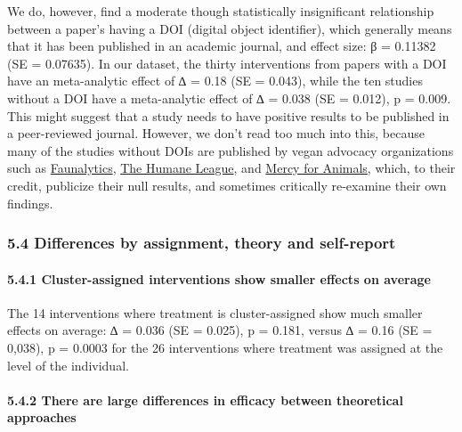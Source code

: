 \documentclass[
  letterpaper,
  DIV=11,
  numbers=noendperiod]{scrartcl}
\let\oldparagraph\paragraph
\renewcommand{\paragraph}[1]{\oldparagraph{#1}\mbox{}}
\begin{document}
We do, however, find a moderate though statistically insignificant
relationship between a paper's having a DOI (digital object identifier),
which generally means that it has been published in an academic journal,
and effect size: β = 0.11382 (SE = 0.07635). In our dataset, the thirty
interventions from papers with a DOI have an meta-analytic effect of ∆ =
0.18 (SE = 0.043), while the ten studies without a DOI have a
meta-analytic effect of ∆ = 0.038 (SE = 0.012), p = 0.009. This might
suggest that a study needs to have positive results to be published in a
peer-reviewed journal. However, we don't read too much into this,
because many of the studies without DOIs are published by vegan advocacy
organizations such as
\href{https://forum.effectivealtruism.org/topics/faunalytics}{Faunalytics},
\href{https://forum.effectivealtruism.org/topics/the-humane-league}{The
Humane League}, and
\href{https://www.google.com/search?q=mercy+for+animals+effective+altruism+forum\&oq=mercy+for+animals+effective+altruism+forum\&gs_lcrp=EgZjaHJvbWUyBggAEEUYOTIHCAEQIRigAdIBCDcxNDRqMGoxqAIAsAIA\&sourceid=chrome\&ie=UTF-8}{Mercy
for Animals}, which, to their credit, publicize their null results, and
sometimes critically re-examine their own findings.

\hypertarget{differences-by-assignment-theory-and-self-report}{%
\subsubsection{5.4 Differences by assignment, theory and
self-report}\label{differences-by-assignment-theory-and-self-report}}

\hypertarget{cluster-assigned-interventions-show-smaller-effects-on-average}{%
\paragraph{5.4.1 Cluster-assigned interventions show smaller effects on
average}\label{cluster-assigned-interventions-show-smaller-effects-on-average}}

The 14 interventions where treatment is cluster-assigned show much
smaller effects on average: ∆ = 0.036 (SE = 0.025), p = 0.181, versus ∆
= 0.16 (SE = 0,038), p = 0.0003 for the 26 interventions where treatment
was assigned at the level of the individual.

\hypertarget{there-are-large-differences-in-efficacy-between-theoretical-approaches}{%
\paragraph{5.4.2 There are large differences in efficacy between
theoretical
approaches}\label{there-are-large-differences-in-efficacy-between-theoretical-approaches}}
\end{document}
